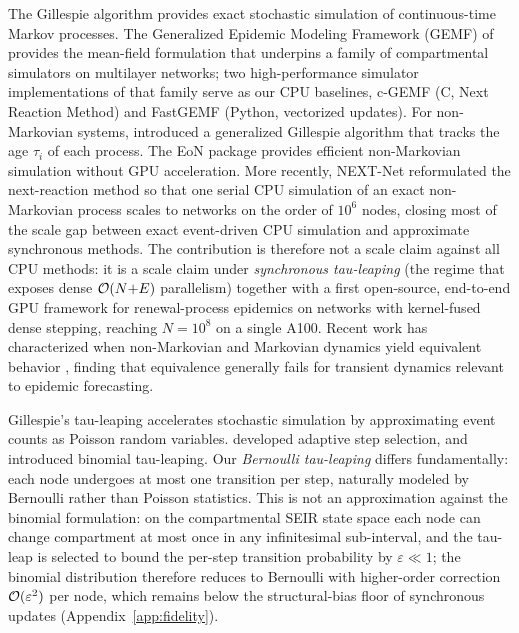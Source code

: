 The Gillespie algorithm \citep{gillespie1977exact, gillespie1976general} provides exact stochastic simulation of continuous-time Markov processes. The Generalized Epidemic Modeling Framework (GEMF) of \citet{sahneh2013generalized} provides the mean-field formulation that underpins a family of compartmental simulators on multilayer networks; two high-performance simulator implementations of that family serve as our CPU baselines, c-GEMF \citep{sahneh2017gemfsim} (C, Next Reaction Method) and FastGEMF \citep{samaei2025fastgemf} (Python, vectorized updates). For non-Markovian systems, \citet{boguna2014simulating} introduced a generalized Gillespie algorithm that tracks the age $\tau_i$ of each process. The EoN package \citep{miller2020eon} provides efficient non-Markovian simulation without GPU acceleration. More recently, NEXT-Net \citep{cure2025fast} reformulated the next-reaction method so that one serial CPU simulation of an exact non-Markovian process scales to networks on the order of $10^6$ nodes, closing most of the scale gap between exact event-driven CPU simulation and approximate synchronous methods. The \flashspread{} contribution is therefore not a scale claim against all CPU methods: it is a scale claim under \emph{synchronous tau-leaping} (the regime that exposes dense $\mathcal{O}(N{+}E)$ parallelism) together with a first open-source, end-to-end GPU framework for renewal-process epidemics on networks with kernel-fused dense stepping, reaching $N = 10^8$ on a single A100. Recent work has characterized when non-Markovian and Markovian dynamics yield equivalent behavior \citep{feng2019equivalence, starnini2017equivalence}, finding that equivalence generally fails for transient dynamics relevant to epidemic forecasting.

Gillespie's tau-leaping \citep{gillespie2001approximate} accelerates stochastic simulation by approximating event counts as Poisson random variables. \citet{cao2006efficient} developed adaptive step selection, and \citet{chatterjee2005binomial} introduced binomial tau-leaping. Our \emph{Bernoulli tau-leaping} differs fundamentally: each node undergoes at most one transition per step, naturally modeled by Bernoulli rather than Poisson statistics. This is not an approximation against the binomial formulation: on the compartmental SEIR state space each node can change compartment at most once in any infinitesimal sub-interval, and the tau-leap is selected to bound the per-step transition probability by $\varepsilon \ll 1$; the binomial distribution therefore reduces to Bernoulli with higher-order correction $\mathcal{O}(\varepsilon^2)$ per node, which remains below the structural-bias floor of synchronous updates (Appendix~\ref{app:fidelity}).

